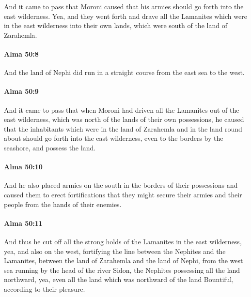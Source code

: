 			And it came to pass that Moroni caused
			that his armies should go forth into the east wilderness.
			Yea, and they went forth and drave all the Lamanites
			which were in the east wilderness
			into their own lands, which were south of the land of Zarahemla.

		\paragraph{Alma 50:8} %
			\label{ALMA-50-8}

			And the land of Nephi did run in a straight course from the east sea to the west.

		\paragraph{Alma 50:9} %
			\label{ALMA-50-9}

			And it came to pass that when Moroni had driven all the Lamanites out
			of the east wilderness, which was north of the lands of their own possessions,
			he caused that the inhabitants
			which were in the land of Zarahemla and in the land round about
			should go forth into the east wilderness,
			even to the borders by the seashore,
			and possess the land.

		\paragraph{Alma 50:10} %
			\label{ALMA-50-10}

			And he also placed armies on the south in the borders of their possessions
			and caused them to erect fortifications
			that they might secure their armies and their people
			from the hands of their enemies.

		\paragraph{Alma 50:11} %
			\label{ALMA-50-11}

			And thus he cut off all the strong holds of the Lamanites
			in the east wilderness, yea, and also on the west,
			fortifying the line between the Nephites and the Lamanites,
			between the land of Zarahemla and the land of Nephi,
			from the west sea running by the head of the river Sidon,
			the Nephites possessing all the land northward,
			yea, even all the land which was northward of the land Bountiful,
			according to their pleasure.

